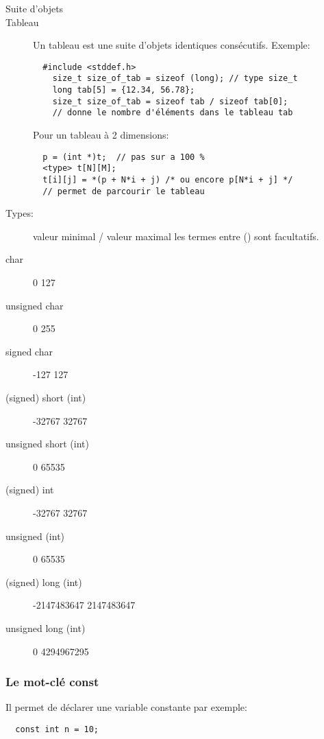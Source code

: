 \documentclass[a4paper]{article}
\begin{document}
\begin{description}
  \item [\guillemotleft{}Suite d'objets\guillemotright{}]
  \item [Tableau] Un tableau est une suite d'objets identiques consécutifs.\newline
  Exemple:
  \begin{lstlisting}
  #include <stddef.h>
    size_t size_of_tab = sizeof (long); // type size_t
    long tab[5] = {12.34, 56.78};
    size_t size_of_tab = sizeof tab / sizeof tab[0];
    // donne le nombre d'éléments dans le tableau tab
  \end{lstlisting}

  Pour un tableau à 2 dimensions:
  \begin{lstlisting}
  p = (int *)t;  // pas sur a 100 %
  <type> t[N][M];
  t[i][j] = *(p + N*i + j) /* ou encore p[N*i + j] */
  // permet de parcourir le tableau
  \end{lstlisting}

  \item [Types:]  valeur minimal / valeur maximal les termes entre \guillemotleft{} () \guillemotright{} sont facultatifs.
  \item [char] 	0 	127
  \item [unsigned char] 	0 	255
  \item [signed char] 	-127 	127
  \item [(signed) short (int)] 	-32767 	32767
  \item [unsigned short (int)]	0 	65535
  \item [(signed) int] 	-32767 	32767
  \item [unsigned (int)] 	0 	65535
  \item [(signed) long (int)] 	-2147483647 	2147483647
  \item [unsigned long (int)] 	0 	4294967295
\end{description}
\subsubsection{Le mot-clé const}
Il permet de déclarer une variable constante par exemple:
\begin{lstlisting}
  const int n = 10;
\end{lstlisting}
\end{document}
